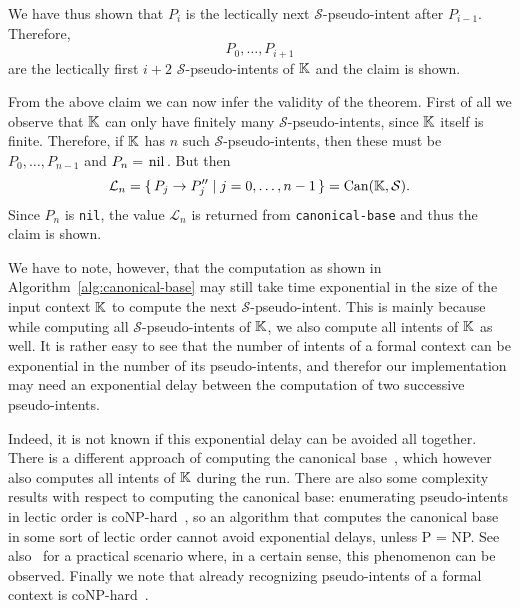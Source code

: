 \begin{Proof}
  We have thus shown that $P_i$ is the lectically next $\mathcal{S}$-pseudo-intent after
  $P_{i-1}$.  Therefore,
  \begin{equation*}
    P_0, \dots, P_{i+1}
  \end{equation*}
  are the lectically first $i+2$ $\mathcal{S}$-pseudo-intents of ${\mathbb{K}}$ and the claim is
  shown.

  From the above claim we can now infer the validity of the theorem.  First of all we
  observe that ${\mathbb{K}}$ can only have finitely many $\mathcal{S}$-pseudo-intents, since
  ${\mathbb{K}}$ itself is finite.  Therefore, if ${\mathbb{K}}$ has $n$ such
  $\mathcal{S}$-pseudo-intents, then these must be $P_0, \dots, P_{n-1}$ and $P_n =
  \text{\lstinline{nil}}$.  But then
  \begin{equation*}
    \mathcal{L}_n = {\{\, P_j \to P_j'' \mid j = 0, \dots, n - 1\,\}} = \operatorname{Can}({\mathbb{K}}, \mathcal{S}).
  \end{equation*}
  Since $P_n$ is \lstinline{nil}, the value $\mathcal{L}_n$ is returned from
  \lstinline{canonical-base} and thus the claim is shown.
\end{Proof}

We have to note, however, that the computation as shown in
Algorithm~\ref{alg:canonical-base} may still take time exponential in the size of the
input context ${\mathbb{K}}$ to compute the next $\mathcal{S}$-pseudo-intent.  This is mainly
because while computing all $\mathcal{S}$-pseudo-intents of ${\mathbb{K}}$, we also compute all
intents of ${\mathbb{K}}$ as well.  It is rather easy to see that the number of intents of a
formal context can be exponential in the number of its pseudo-intents, and therefor our
implementation may need an exponential delay between the computation of two successive
pseudo-intents.

Indeed, it is not known if this exponential delay can be avoided all together.  There is a
different approach of computing the canonical base~\cite{DBLP:journals/amai/ObiedkovD07},
which however also computes all intents of ${\mathbb{K}}$ during the run.  There are also some
complexity results with respect to computing the canonical base: enumerating
pseudo-intents in lectic order is coNP-hard~\cite{DBLP:conf/icfca/Distel10}, so an
algorithm that computes the canonical base in some sort of lectic order cannot avoid
exponential delays, unless P = NP.  See also~\cite{DBLP:conf/icdm/BorchmannD11} for a
practical scenario where, in a certain sense, this phenomenon can be observed.  Finally we
note that already recognizing pseudo-intents of a formal context is
coNP-hard~\cite{DBLP:journals/dam/BabinK13}.

